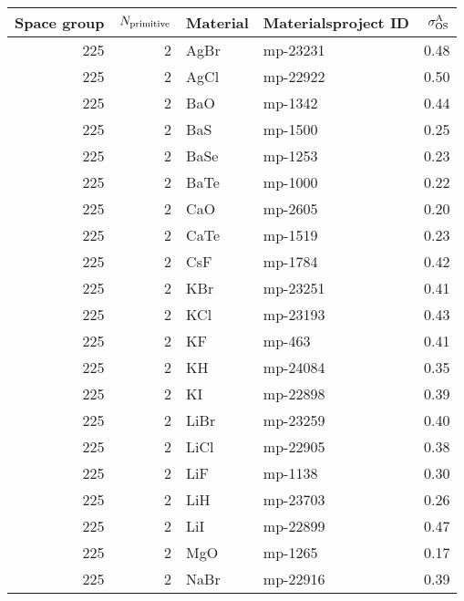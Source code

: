 \begin{table}[t]
\small
\begin{tabular}{rrllr}
\toprule
 Space group &  $N_{\rm primitive}$  &     Material & Materialsproject ID &  $\sigma^\mathrm{A}_\mathrm{OS}$ \\
\midrule
         225 &            2 &         AgBr &   mp-23231 &       0.48 \\
         225 &            2 &         AgCl &   mp-22922 &       0.50 \\
         225 &            2 &          BaO &    mp-1342 &       0.44 \\
         225 &            2 &          BaS &    mp-1500 &       0.25 \\
         225 &            2 &         BaSe &    mp-1253 &       0.23 \\
         225 &            2 &         BaTe &    mp-1000 &       0.22 \\
         225 &            2 &          CaO &    mp-2605 &       0.20 \\
         225 &            2 &         CaTe &    mp-1519 &       0.23 \\
         225 &            2 &          CsF &    mp-1784 &       0.42 \\
         225 &            2 &          KBr &   mp-23251 &       0.41 \\
         225 &            2 &          KCl &   mp-23193 &       0.43 \\
         225 &            2 &           KF &     mp-463 &       0.41 \\
         225 &            2 &           KH &   mp-24084 &       0.35 \\
         225 &            2 &           KI &   mp-22898 &       0.39 \\
         225 &            2 &         LiBr &   mp-23259 &       0.40 \\
         225 &            2 &         LiCl &   mp-22905 &       0.38 \\
         225 &            2 &          LiF &    mp-1138 &       0.30 \\
         225 &            2 &          LiH &   mp-23703 &       0.26 \\
         225 &            2 &          LiI &   mp-22899 &       0.47 \\
         225 &            2 &          MgO &    mp-1265 &       0.17 \\
         225 &            2 &         NaBr &   mp-22916 &       0.39 \\

\end{tabular}
\end{table}

